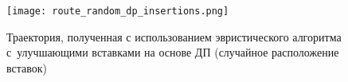 \begin{figure}[H]
  \centering
  \texttt{[image: route\_random\_dp\_insertions.png]}
  \caption{
    Траектория, полученная с использованием эвристического алгоритма
    с~улучшающими вставками на основе ДП (случайное расположение вставок)
  }
  \label{DP_Random_Inserts_Result}
\end{figure}
